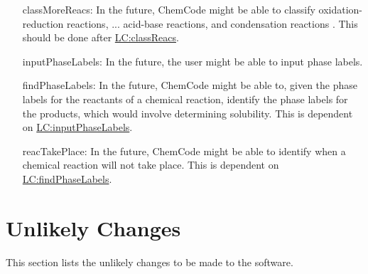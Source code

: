 \documentclass[12pt]{article}
\begin{document}
\begin{itemize}
\item[classMoreReacs:\phantomsection\label{classMoreReacs}]{In the future, ChemCode might be able to classify oxidation-reduction reactions, ... acid-base reactions, and condensation reactions \cite[(pg. 301)]{lund2023}. This should be done after \hyperref[classReacs]{LC:classReacs}.}
\item[inputPhaseLabels:\phantomsection\label{inputPhaseLabels}]{In the future, the user might be able to input phase labels.}
\item[findPhaseLabels:\phantomsection\label{findPhaseLabels}]{In the future, ChemCode might be able to, given the phase labels for the reactants of a chemical reaction, identify the phase labels for the products, which would involve determining solubility. This is dependent on \hyperref[inputPhaseLabels]{LC:inputPhaseLabels}.}
\item[reacTakePlace:\phantomsection\label{reacTakePlace}]{In the future, ChemCode might be able to identify when a chemical reaction will not take place. This is dependent on \hyperref[findPhaseLabels]{LC:findPhaseLabels}.}
\end{itemize}
\section{Unlikely Changes}
\label{Sec:UCs}
This section lists the unlikely changes to be made to the software.
\end{document}
